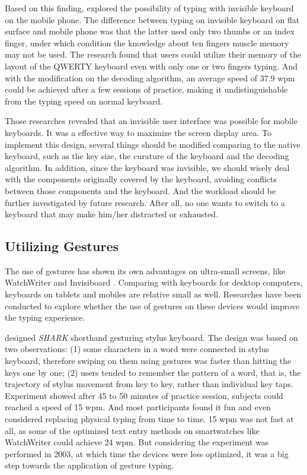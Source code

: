 \documentclass[11pt]{article}
\begin{document}
Based on this finding, \citet{10.1145/3173574.3174013} explored the possibility of typing with invisible keyboard on the mobile phone. The difference between typing on invisible keyboard on flat surface and mobile phone was that the latter used only two thumbs or an index finger, under which condition the knowledge about ten fingers muscle memory may not be used. The research found that users could utilize their memory of the layout of the QWERTY keyboard even with only one or two fingers typing. And with the modification on the decoding algorithm, an average speed of 37.9 wpm could be achieved after a few sessions of practice, making it undistinguishable from the typing speed on normal keyboard.

Those researches revealed that an invisible user interface was possible for mobile keyboards. It was a effective way to maximize the screen display area. To implement this design, several things should be modified comparing to the native keyboard, such as the key size, the curature of the keyboard and the decoding algorithm. In addition, since the keyboard was invisible, we should wisely deal with the components originally covered by the keyboard, avoiding conflicts between those components and the keyboard. And the workload should be further investigated by future research. After all, no one wants to switch to a keyboard that may make him/her distracted or exhausted.

\subsection{Utilizing Gestures}
The use of gestures has shown its own advantages on ultra-small screens, like WatchWriter \citep{10.1145/2858036.2858242} and Invisiboard \citep{10.1145/2935334.2935360}. Comparing with keyboards for desktop computers, keyboards on tablets and mobiles are relative small as well. Researches have been conducted to explore whether the use of gestures on these devices would improve the typing experience.

\citet{10.1145/642611.642630} designed \textit{SHARK} shorthand gesturing stylus keyboard. The design was based on two observations: (1) some characters in a word were connected in stylus keyboard, therefore swiping on them using gestures was faster than hitting the keys one by one; (2) users tended to remember the pattern of a word, that is, the trajectory of stylus movement from key to key, rather than individual key taps. Experiment showed after 45 to 50 minutes of practice session, subjects could reached a speed of 15 wpm. And most participants found it fun and even considered replacing physical typing from time to time. 15 wpm was not fast at all, as some of the optimized text entry methods on smartwatches like WatchWriter \citep{10.1145/2858036.2858242} could achieve 24 wpm. But considering the experiment was performed in 2003, at which time the devices were less optimized, it was a big step towards the application of gesture typing.
\end{document}

